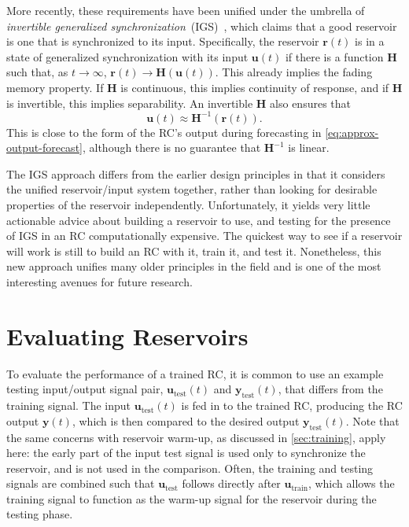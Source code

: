 More recently, these requirements have been unified under the umbrella
of \emph{invertible generalized
  synchronization}~(IGS)~\cite{lu2018,lymburn2019,lu2020}, which claims that
a good reservoir is one that is synchronized to its
input. Specifically, the reservoir $\bm{r}(t)$ is in a state of
generalized synchronization with its input $\bm{u}(t)$ if there is a
function $\bm{H}$ such that, as $t \rightarrow \infty$, $\bm{r}(t)
\rightarrow \bm{H}\left(\bm{u}(t)\right)$. This already implies the
fading memory property. If $\bm{H}$ is continuous, this implies continuity of response, and if $\bm{H}$ is invertible, this implies separability. An invertible $\bm{H}$ also ensures that
\begin{equation}
  \bm{u}(t) \approx \bm{H}^{-1}\left(\bm{r}(t)\right).
\end{equation}
This is close to the form of the RC's output during forecasting in
\cref{eq:approx-output-forecast}, although there is no guarantee that
$\bm{H}^{-1}$ is linear.

The IGS approach differs from the earlier design principles in that it
considers the unified reservoir/input system together, rather than
looking for desirable properties of the reservoir
independently. Unfortunately, it yields very little actionable advice
about building a reservoir to use, and testing for the presence of IGS
in an RC computationally expensive. The quickest way to see if a
reservoir will work is still to build an RC with it, train it, and
test it. Nonetheless, this new approach unifies many older principles
in the field and is one of the most interesting avenues for future
research.

\section{Evaluating Reservoirs}

To evaluate the performance of a trained RC, it is common to use an
example testing input/output signal pair, $\bm{u}_\text{test}(t)$ and
$\bm{y}_\text{test}(t)$, that differs from the training signal. The
input $\bm{u}_\text{test}(t)$ is fed in to the trained RC, producing
the RC output $\bm{y}(t)$, which is then compared to the desired
output $\bm{y}_\text{test}(t)$. Note that the same concerns with
reservoir warm-up, as discussed in \cref{sec:training}, apply here: the
early part of the input test signal is used only to synchronize the
reservoir, and is not used in the comparison. Often, the training and
testing signals are combined such that $\bm{u}_\text{test}$ follows
directly after $\bm{u}_\text{train}$, which allows the training signal
to function as the warm-up signal for the reservoir during the testing
phase.

